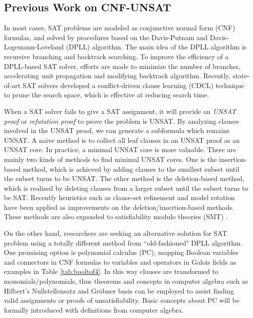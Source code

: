 \subsection{Previous Work on CNF-UNSAT}
In most cases, SAT problems are modeled as conjunctive normal form (CNF) formulas, and solved by procedures based on 
the Davis-Putnam and Davis-Logemann-Loveland (DPLL) algorithm. The main idea of the DPLL algorithm
is recursive branching and backtrack searching. To improve the efficiency of a DPLL-based
SAT solver, efforts are made to minimize the number of branches, accelerating unit propagation
and modifying backtrack algorithm. Recently, state-of-art SAT solvers developed a conflict-driven
clause learning (CDCL) technique to prune the search space, which is effective at reducing
search time.

When a SAT solver fails to give a SAT assignment, it will provide an {\it UNSAT proof} or {\it refutation proof}
to prove the problem is UNSAT. By analyzing clauses involved in the UNSAT proof, we can 
generate a subformula which remains UNSAT. A naive method is to collect all leaf 
clauses in an UNSAT proof as an UNSAT core. In practice, a minimal UNSAT core is more valuable.
There are mainly two kinds of methods to find minimal UNSAT cores.
One is the insertion-based method, which is achieved by adding clauses to the smallest subset 
until the subset turns to be UNSAT. The other method is the deletion-based method,
which is realized by deleting clauses from a larger subset until the subset turns to be SAT.
Recently heuristics such as clause-set refinement \cite{modelrotation} and model rotation \cite{belov2011accelerating}
have been applied as improvements on the deletion/insertion-based methods.
These methods are also expanded to satisfiability modulo theories (SMT) \cite{cimatti2007simple}.

On the other hand, researchers are seeking an alternative solution for SAT problem using a totally
different method from ``old-fashioned" DPLL algorithm. One promising option is polynomial calculus (PC),
mapping Boolean variables and connectors in CNF formulas to variables and operators in 
Galois fields as examples in Table \ref{tab:booltof4}. In this way clauses are transformed to monomials/polynomials, thus theorems and concepts in computer
algebra such as Hilbert's Nullstellensatz and Gr\"obner basis can be employed to assist finding
valid assignments or proofs of unsatisfiability. Basic concepts about PC will be formally introduced with definitions
from computer algebra.

